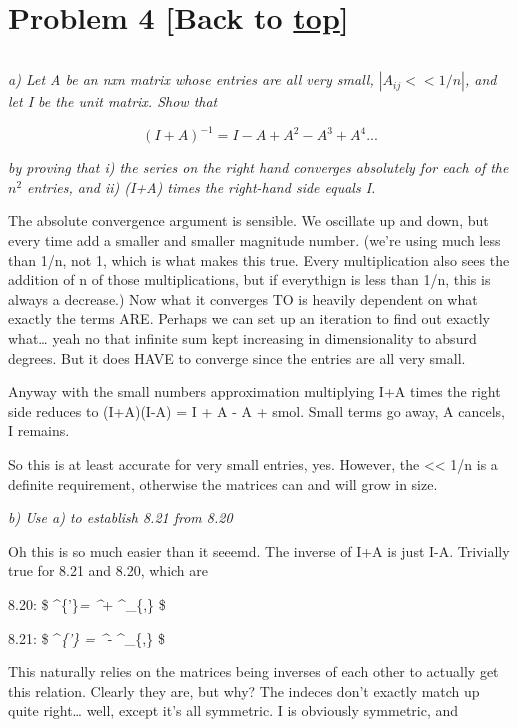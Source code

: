 \documentclass[landscape,letterpaper,10pt,english]{article}
\begin{document}
    \hypertarget{problem-4-back-to-top}{%
\section{\texorpdfstring{Problem 4 {[}Back to
\hyperref[toc]{top}{]}}{Problem 4 {[}Back to {]}}}\label{problem-4-back-to-top}}

\[\label{P4}\]

\emph{a) Let A be an nxn matrix whose entries are all very small,
\(|A_{ij} << 1/n|\), and let I be the unit matrix. Show that}

\[ (I+A)^{-1} = I - A + A^2 - A^3 + A^4 ... \]

\emph{by proving that i) the series on the right hand converges
absolutely for each of the \(n^2\) entries, and ii) (I+A) times the
right-hand side equals I.}

    The absolute convergence argument is sensible. We oscillate up and down,
but every time add a smaller and smaller magnitude number. (we're using
much less than 1/n, not 1, which is what makes this true. Every
multiplication also sees the addition of n of those multiplications, but
if everythign is less than 1/n, this is always a decrease.) Now what it
converges TO is heavily dependent on what exactly the terms ARE. Perhaps
we can set up an iteration to find out exactly what\ldots{} yeah no that
infinite sum kept increasing in dimensionality to absurd degrees. But it
does HAVE to converge since the entries are all very small.

Anyway with the small numbers approximation multiplying I+A times the
right side reduces to (I+A)(I-A) = I + A - A + smol. Small terms go
away, A cancels, I remains.

So this is at least accurate for very small entries, yes. However, the
\textless\textless{} 1/n is a definite requirement, otherwise the
matrices can and will grow in size.

    \emph{b) Use a) to establish 8.21 from 8.20}

    Oh this is so much easier than it seeemd. The inverse of I+A is just
I-A. Trivially true for 8.21 and 8.20, which are

8.20: \$ \Lambda\^{}\{\alpha'\}\emph{\beta = \delta\^{}\alpha}\beta +
\xi\^{}\alpha\_\{,\beta\} \$

8.21: \$ \Lambda\^{}\alpha\emph{\{\beta'\} = \delta\^{}\alpha}\beta -
\xi\^{}\alpha\_\{,\beta\} \$

    This naturally relies on the matrices being inverses of each other to
actually get this relation. Clearly they are, but why? The indeces don't
exactly match up quite right\ldots{} well, except it's all symmetric. I
is obviously symmetric, and
\end{document}
